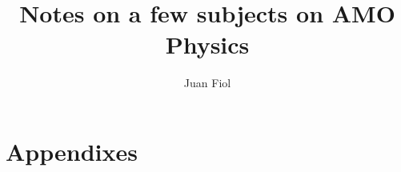 \documentclass[a4paper,12pt,english,oneside,fleqn]{book}
\begin{document}
\title{Notes on a few subjects on AMO Physics}

\author{Juan Fiol}
\maketitle
\tableofcontents
%
% 
% 
% 
% 
% 
% 



% 
% 
% 
% 
% 

% 
% 

\part{Appendixes}
\appendix{}
% 
% 
% 
% 
% 

\printbibliography 
\end{document}
